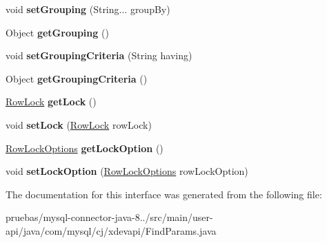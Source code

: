 \begin{DoxyCompactItemize}
void {\bfseries set\+Grouping} (String... group\+By)
\item 
\mbox{\label{interfacecom_1_1mysql_1_1cj_1_1xdevapi_1_1_find_params_a15fa515ae7f34cb307895ce4fa136bcd}} 
Object {\bfseries get\+Grouping} ()
\item 
\mbox{\label{interfacecom_1_1mysql_1_1cj_1_1xdevapi_1_1_find_params_a5f520024fb2633d0ab42d573c7aeac03}} 
void {\bfseries set\+Grouping\+Criteria} (String having)
\item 
\mbox{\label{interfacecom_1_1mysql_1_1cj_1_1xdevapi_1_1_find_params_a110c833cc33c7f15da0eda4e12f946cf}} 
Object {\bfseries get\+Grouping\+Criteria} ()
\item 
\mbox{\label{interfacecom_1_1mysql_1_1cj_1_1xdevapi_1_1_find_params_a4b415ce43977c05c58ed209b5d200c27}} 
\mbox{\hyperlink{enumcom_1_1mysql_1_1cj_1_1xdevapi_1_1_find_params_1_1_row_lock}{Row\+Lock}} {\bfseries get\+Lock} ()
\item 
\mbox{\label{interfacecom_1_1mysql_1_1cj_1_1xdevapi_1_1_find_params_a7fe3613c0ce317de5b1ae07772d88844}} 
void {\bfseries set\+Lock} (\mbox{\hyperlink{enumcom_1_1mysql_1_1cj_1_1xdevapi_1_1_find_params_1_1_row_lock}{Row\+Lock}} row\+Lock)
\item 
\mbox{\label{interfacecom_1_1mysql_1_1cj_1_1xdevapi_1_1_find_params_a8e6ab7c549b8fd7427416bf908c7ab2e}} 
\mbox{\hyperlink{enumcom_1_1mysql_1_1cj_1_1xdevapi_1_1_find_params_1_1_row_lock_options}{Row\+Lock\+Options}} {\bfseries get\+Lock\+Option} ()
\item 
\mbox{\label{interfacecom_1_1mysql_1_1cj_1_1xdevapi_1_1_find_params_ac8aeb07d03a738ecb454c8897e4706ad}} 
void {\bfseries set\+Lock\+Option} (\mbox{\hyperlink{enumcom_1_1mysql_1_1cj_1_1xdevapi_1_1_find_params_1_1_row_lock_options}{Row\+Lock\+Options}} row\+Lock\+Option)
\end{DoxyCompactItemize}


The documentation for this interface was generated from the following file\+:\begin{DoxyCompactItemize}
\item 
pruebas/mysql-\/connector-\/java-\/8../src/main/user-\/api/java/com/mysql/cj/xdevapi/Find\+Params.\+java\end{DoxyCompactItemize}
